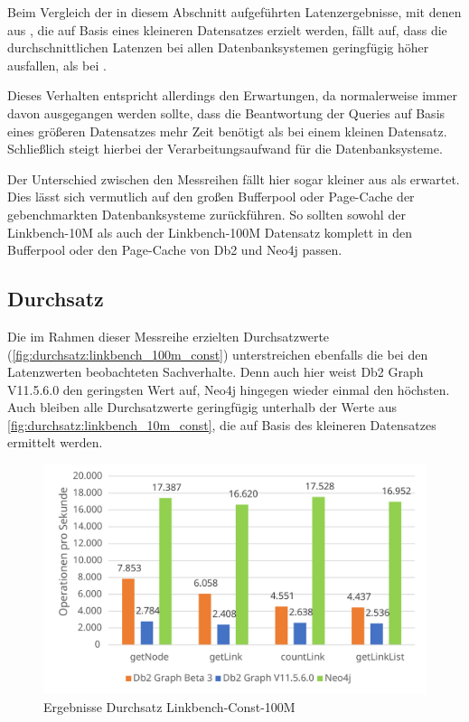 Beim Vergleich der in diesem Abschnitt aufgeführten Latenzergebnisse, mit denen aus , die auf Basis eines kleineren Datensatzes erzielt werden, fällt auf, dass die durchschnittlichen Latenzen bei allen Datenbanksystemen geringfügig höher ausfallen, als bei . 

Dieses Verhalten entspricht allerdings den Erwartungen, da normalerweise immer davon ausgegangen werden sollte, dass die Beantwortung der Queries auf Basis eines größeren Datensatzes mehr Zeit benötigt als bei einem kleinen Datensatz. Schließlich steigt hierbei der Verarbeitungsaufwand für die Datenbanksysteme. 

Der Unterschied zwischen den Messreihen fällt hier sogar kleiner aus als erwartet. Dies lässt sich vermutlich auf den großen Bufferpool oder Page-Cache der gebenchmarkten Datenbanksysteme zurückführen. So sollten sowohl der Linkbench-10M als auch der Linkbench-100M Datensatz komplett in den Bufferpool oder den Page-Cache von Db2 und Neo4j passen.

\subsection{Durchsatz}
Die im Rahmen dieser Messreihe erzielten Durchsatzwerte (\autoref{fig:durchsatz:linkbench_100m_const}) unterstreichen ebenfalls die bei den Latenzwerten beobachteten Sachverhalte. Denn auch hier weist Db2 Graph V11.5.6.0 den geringsten Wert auf, Neo4j hingegen wieder einmal den höchsten. Auch bleiben alle Durchsatzwerte geringfügig unterhalb der Werte aus \autoref{fig:durchsatz:linkbench_10m_const}, die auf Basis des kleineren Datensatzes ermittelt werden. 

\begin{figure}[!ht]
    \centering
    \includegraphics[width=\textwidth]{images/diagramme/linkbench_100m_const_durchsatz.pdf}
    \caption{Ergebnisse Durchsatz Linkbench-Const-100M}
    \label{fig:durchsatz:linkbench_100m_const}
\end{figure}

